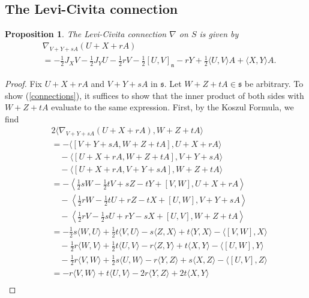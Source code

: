 \documentclass{amsart}
\newcommand{\s}{\mathfrak s}
\newcommand{\n}{\mathfrak n}
\theoremstyle{plain}
\newtheorem{proposition}[theorem]{Proposition}
\theoremstyle{definition}
\theoremstyle{remark}
\begin{document}
 	

 	
 	\subsection{The Levi-Civita connection}
 	
 	\begin{proposition}
 		The Levi-Civita connection $\nabla$ on $S$ is given by
 		\begin{align}
 			&\nabla_{V+Y+sA}(U+X+rA) \nonumber\\
 			&= -\frac12 J_X V  -\frac12 J_Y U - \frac12 rV - \frac12 [U,V]_\n -rY + \frac12 \langle U,V \rangle A + \langle X,Y \rangle A. \label{connections}
 		\end{align}
 	\end{proposition}
 	\begin{proof}
 		Fix $U+X+rA$ and $V+Y+sA$ in $\s$. Let $W+Z+tA \in \s$ be arbitrary. To show (\ref{connections}), it suffices to show that the inner product of both sides with $W+Z+tA$ evaluate to the same expression.
 		First, by the Koszul Formula, we find 
 		\begin{align*}
 			&2 \langle \nabla_{V+Y+ sA}(U+X+rA),W+Z+tA \rangle \\
 			&= - \langle [V+Y+sA,W+Z+tA], U+X+rA \rangle \\
 			&\quad -\langle[U+X+rA, W+Z+tA], V+Y+sA \rangle \\
 			& \quad - \langle [U+X+rA, V+Y+ sA],W+Z+tA \rangle \\
 			&= - \left\langle \frac12 sW - \frac12 tV+ sZ - tY + [V,W], U+X+rA \right\rangle \\
 			&\quad -\left\langle \frac12 rW - \frac12 tU + rZ - tX +[U,W], V+Y+sA \right\rangle \\
 			& \quad - \left\langle \frac12 rV - \frac12 sU + rY -sX+[U,V],W+Z+tA \right\rangle \\ 
 			&= - \frac12 s \langle W,U\rangle + \frac12 t \langle V,U \rangle - s \langle Z,X \rangle + t\langle Y,X \rangle - \langle [V,W],X \rangle \\
 			&\quad - \frac12 r \langle W,V \rangle + \frac12 t \langle U,V \rangle - r\langle Z,Y \rangle + t \langle X,Y \rangle - \langle[U,W],Y \rangle \\
 			&\quad - \frac12 r \langle V,W \rangle + \frac12 s \langle U,W \rangle - r\langle Y,Z \rangle + s\langle X,Z \rangle - \langle [U,V],Z \rangle \\
 			&=-r\langle V,W \rangle + t \langle U,V \rangle -2r \langle Y,Z \rangle + 2t \langle X,Y \rangle \\

\end{align*}
\end{proof}
\end{document}
